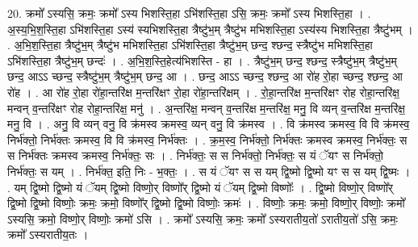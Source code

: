 \documentclass[17pt]{extarticle}
\begin{document}
20. क्रमो᳚ ऽस्यसि॒ क्रमः॒ क्रमो᳚ ऽस्य भिशस्ति॒हा ऽभि॑शस्ति॒हा ऽसि॒ क्रमः॒ क्रमो᳚ ऽस्य भिशस्ति॒हा । . अ॒स्य॒भि॒श॒स्ति॒हा ऽभि॑शस्ति॒हा ऽस्य॑ स्यभिशस्ति॒हा त्रैष्टु॑भ॒म् त्रैष्टु॑भ मभिशस्ति॒हा ऽस्य॑स्य भिशस्ति॒हा त्रैष्टु॑भम् । . अ॒भि॒श॒स्ति॒हा त्रैष्टु॑भ॒म् त्रैष्टु॑भ मभिशस्ति॒हा ऽभि॑शस्ति॒हा त्रैष्टु॑भ॒म् छन्द॒ श्छन्द॒ स्त्रैष्टु॑भ मभिशस्ति॒हा ऽभि॑शस्ति॒हा त्रैष्टु॑भ॒म् छन्दः॑ । . अ॒भि॒श॒स्ति॒हेत्य॑भिशस्ति - हा । . त्रैष्टु॑भ॒म् छन्द॒ श्छन्द॒ स्त्रैष्टु॑भ॒म् त्रैष्टु॑भ॒म् छन्द॒ आऽऽ च्छन्द॒ स्त्रैष्टु॑भ॒म् त्रैष्टु॑भ॒म् छन्द॒ आ । . छन्द॒ आऽऽ च्छन्द॒ श्छन्द॒ आ रो॑ह रो॒हा च्छन्द॒ श्छन्द॒ आ रो॑ह । . आ रो॑ह रो॒हा रो॑हा॒न्तरि॑क्ष म॒न्तरि॑क्षꣳ रो॒हा रो॑हा॒न्तरि॑क्षम् । . रो॒हा॒न्तरि॑क्ष म॒न्तरि॑क्षꣳ रोह रोहा॒न्तरि॑क्ष॒ मन्वन् व॒न्तरि॑क्षꣳ रोह रोहा॒न्तरि॑क्ष॒ मनु॑ । . अ॒न्तरि॑क्ष॒ मन्वन् व॒न्तरि॑क्ष म॒न्तरि॑क्ष॒ मनु॒ वि व्यन् व॒न्तरि॑क्ष म॒न्तरि॑क्ष॒ मनु॒ वि । . अनु॒ वि व्यन् वनु॒ वि क्र॑मस्व क्रमस्व॒ व्यन् वनु॒ वि क्र॑मस्व । . वि क्र॑मस्व क्रमस्व॒ वि वि क्र॑मस्व॒ निर्भ॑क्तो॒ निर्भ॑क्तः क्रमस्व॒ वि वि क्र॑मस्व॒ निर्भ॑क्तः । . क्र॒म॒स्व॒ निर्भ॑क्तो॒ निर्भ॑क्तः क्रमस्व क्रमस्व॒ निर्भ॑क्तः॒ स स निर्भ॑क्तः क्रमस्व क्रमस्व॒ निर्भ॑क्तः॒ सः । . निर्भ॑क्तः॒ स स निर्भ॑क्तो॒ निर्भ॑क्तः॒ स यं ॅयꣳ स निर्भ॑क्तो॒ निर्भ॑क्तः॒ स यम् । . निर्भ॑क्त॒ इति॒ निः - भ॒क्तः॒ । . स यं ॅयꣳ स स यम् द्वि॒ष्मो द्वि॒ष्मो यꣳ स स यम् द्वि॒ष्मः । . यम् द्वि॒ष्मो द्वि॒ष्मो यं ॅयम् द्वि॒ष्मो विष्णो॒र् विष्णो᳚र् द्वि॒ष्मो यं ॅयम् द्वि॒ष्मो विष्णोः᳚ । . द्वि॒ष्मो विष्णो॒र् विष्णो᳚र् द्वि॒ष्मो द्वि॒ष्मो विष्णोः॒ क्रमः॒ क्रमो॒ विष्णो᳚र् द्वि॒ष्मो द्वि॒ष्मो विष्णोः॒ क्रमः॑ । . विष्णोः॒ क्रमः॒ क्रमो॒ विष्णो॒र् विष्णोः॒ क्रमो᳚ ऽस्यसि॒ क्रमो॒ विष्णो॒र् विष्णोः॒ क्रमो॑ ऽसि । . क्रमो᳚ ऽस्यसि॒ क्रमः॒ क्रमो᳚ ऽस्यरातीय॒तो॑ ऽरातीय॒तो॑ ऽसि॒ क्रमः॒ क्रमो᳚ ऽस्यरातीय॒तः । \newline
\end{document}
